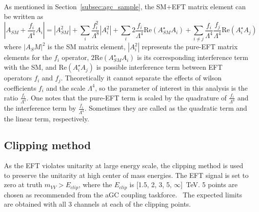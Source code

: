 As mentioned in Section~\ref{subsec:agc_sample}, the SM+EFT matrix element can be written as
\begin{equation}
   |A_{SM}+\frac{f_i}{\Lambda^4}A_i|=|A_{SM}^2|+\sum\limits_i \frac{f_i^2}{\Lambda^8}|A_{i}^2|+ \sum\limits_i 2 \frac{f_i}{\Lambda^4} \mathrm{Re}(A_{SM}^\star A_i) +\sum\limits_{i\neq j} \frac{f_i}{\Lambda^4} \frac{f_j}{\Lambda^4} \mathrm{Re}(A_i^\star A_j)
\end{equation}
where $|A_SM|^2$ is the SM matrix element, $|A_{i}^2|$ represents the pure-EFT matrix elements for the $f_{i}$ operator, $2 \mathrm{Re}(A_{SM}^\star A_i)$ is its corresponding interference term with the SM, and $\mathrm{Re}(A_i^\star A_j)$ is possible interference term between EFT operators $f_{i}$ and $f_{j}$. 
Theoretically it cannot separate the effects of wilson coefficients $f_i$ and the scale $\Lambda^4$, so the parameter of interest in this analysis is the ratio $\frac{f_i}{\Lambda^4}$. %
One notes that the pure-EFT term is scaled by the quadrature of $\frac{f_i}{\Lambda^4}$ and the interference term by $\frac{f_{i}}{\Lambda^4}$.
Sometimes they are called as the quadratic term and the linear term, respectively.


\subsection{Clipping method}
\label{subsec:clipping}
As the EFT violates unitarity at large energy scale, the clipping method is used to preserve the unitarity at high center of mass energies. 
The EFT signal is set to zero at truth $m_{VV} > E_{clip}$, where the $E_{clip}$ is [1.5, 2, 3, 5, $\infty$]~TeV. 
5 points are chosen as recommended from the aGC coupling taskforce.~\cite{ATL-COM-PHYS-2017-433} 
The expected limits are obtained with all 3 channels at each of the clipping points.

